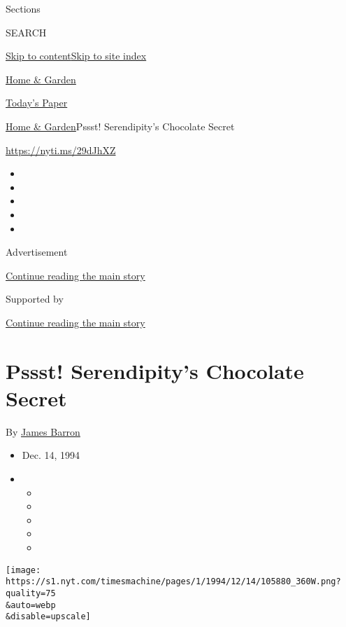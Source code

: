 Sections

SEARCH

\protect\hyperlink{site-content}{Skip to
content}\protect\hyperlink{site-index}{Skip to site index}

\href{https://www.nytimes.com/pages/garden/index.html}{Home \& Garden}

\href{https://myaccount.nytimes.com/auth/login?response_type=cookie\&client_id=vi}{}

\href{https://www.nytimes.com/section/todayspaper}{Today's Paper}

\href{/pages/garden/index.html}{Home \& Garden}\textbar{}Pssst!
Serendipity's Chocolate Secret

\href{https://nyti.ms/29dJhXZ}{https://nyti.ms/29dJhXZ}

\begin{itemize}
\item
\item
\item
\item
\item
\end{itemize}

Advertisement

\protect\hyperlink{after-top}{Continue reading the main story}

Supported by

\protect\hyperlink{after-sponsor}{Continue reading the main story}

\hypertarget{pssst-serendipitys-chocolate-secret}{%
\section{Pssst! Serendipity's Chocolate
Secret}\label{pssst-serendipitys-chocolate-secret}}

By \href{https://www.nytimes.com/by/james-barron}{James Barron}

\begin{itemize}
\item
  Dec. 14, 1994
\item
  \begin{itemize}
  \item
  \item
  \item
  \item
  \item
  \end{itemize}
\end{itemize}

\texttt{[image: https://s1.nyt.com/timesmachine/pages/1/1994/12/14/105880\_360W.png?quality=75\\\&auto=webp\\\&disable=upscale]}


